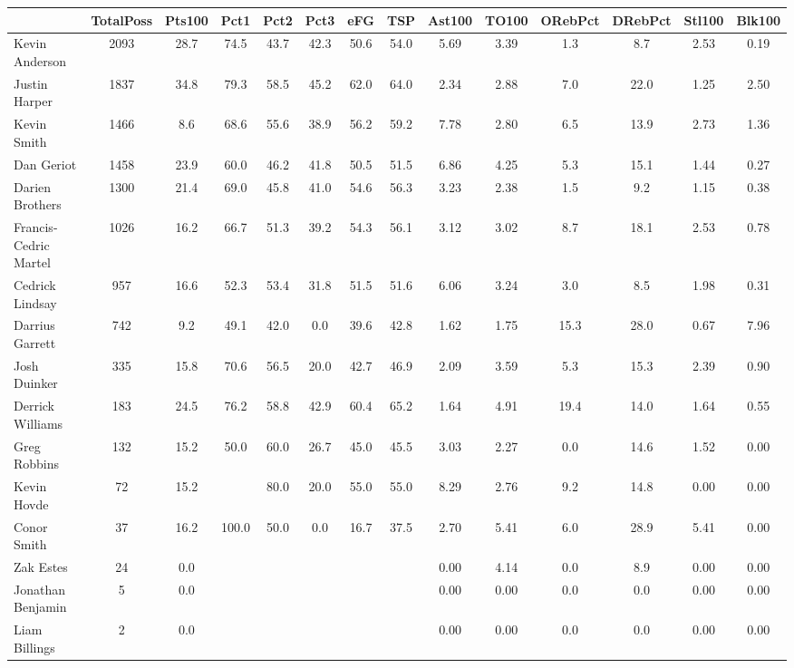 \documentclass[10pt,letterpaper]{article}
\begin{document}
\begin{table}[ht]
\begin{center}
\begin{tabular}{lccccccccccccc}
  \hline
 & TotalPoss & Pts100 & Pct1 & Pct2 & Pct3 & eFG & TSP & Ast100 & TO100 & ORebPct & DRebPct & Stl100 & Blk100 \\ 
  \hline
Kevin Anderson & 2093 & 28.7 & 74.5 & 43.7 & 42.3 & 50.6 & 54.0 & 5.69 & 3.39 & 1.3 & 8.7 & 2.53 & 0.19 \\ 
  Justin Harper & 1837 & 34.8 & 79.3 & 58.5 & 45.2 & 62.0 & 64.0 & 2.34 & 2.88 & 7.0 & 22.0 & 1.25 & 2.50 \\ 
  Kevin Smith & 1466 & 8.6 & 68.6 & 55.6 & 38.9 & 56.2 & 59.2 & 7.78 & 2.80 & 6.5 & 13.9 & 2.73 & 1.36 \\ 
  Dan Geriot & 1458 & 23.9 & 60.0 & 46.2 & 41.8 & 50.5 & 51.5 & 6.86 & 4.25 & 5.3 & 15.1 & 1.44 & 0.27 \\ 
  Darien Brothers & 1300 & 21.4 & 69.0 & 45.8 & 41.0 & 54.6 & 56.3 & 3.23 & 2.38 & 1.5 & 9.2 & 1.15 & 0.38 \\ 
  Francis-Cedric Martel & 1026 & 16.2 & 66.7 & 51.3 & 39.2 & 54.3 & 56.1 & 3.12 & 3.02 & 8.7 & 18.1 & 2.53 & 0.78 \\ 
  Cedrick Lindsay & 957 & 16.6 & 52.3 & 53.4 & 31.8 & 51.5 & 51.6 & 6.06 & 3.24 & 3.0 & 8.5 & 1.98 & 0.31 \\ 
  Darrius Garrett & 742 & 9.2 & 49.1 & 42.0 & 0.0 & 39.6 & 42.8 & 1.62 & 1.75 & 15.3 & 28.0 & 0.67 & 7.96 \\ 
  Josh Duinker & 335 & 15.8 & 70.6 & 56.5 & 20.0 & 42.7 & 46.9 & 2.09 & 3.59 & 5.3 & 15.3 & 2.39 & 0.90 \\ 
  Derrick Williams & 183 & 24.5 & 76.2 & 58.8 & 42.9 & 60.4 & 65.2 & 1.64 & 4.91 & 19.4 & 14.0 & 1.64 & 0.55 \\ 
  Greg Robbins & 132 & 15.2 & 50.0 & 60.0 & 26.7 & 45.0 & 45.5 & 3.03 & 2.27 & 0.0 & 14.6 & 1.52 & 0.00 \\ 
  Kevin Hovde & 72 & 15.2 &  & 80.0 & 20.0 & 55.0 & 55.0 & 8.29 & 2.76 & 9.2 & 14.8 & 0.00 & 0.00 \\ 
  Conor Smith & 37 & 16.2 & 100.0 & 50.0 & 0.0 & 16.7 & 37.5 & 2.70 & 5.41 & 6.0 & 28.9 & 5.41 & 0.00 \\ 
  Zak Estes & 24 & 0.0 &  &  &  &  &  & 0.00 & 4.14 & 0.0 & 8.9 & 0.00 & 0.00 \\ 
  Jonathan Benjamin & 5 & 0.0 &  &  &  &  &  & 0.00 & 0.00 & 0.0 & 0.0 & 0.00 & 0.00 \\ 
  Liam Billings & 2 & 0.0 &  &  &  &  &  & 0.00 & 0.00 & 0.0 & 0.0 & 0.00 & 0.00 \\ 
   \hline
\end{tabular}
\end{center}
\end{table}
\end{document}
